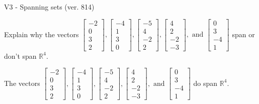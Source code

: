 \begin{exercise}
  \begin{exerciseTitle}V3 - Spanning sets (ver. 814)\end{exerciseTitle}
  \begin{exerciseStatement}
    Explain why the vectors \(\left[\begin{array}{r}
-2 \\
0 \\
3 \\
2
\end{array}\right] , \left[\begin{array}{r}
-4 \\
1 \\
3 \\
0
\end{array}\right] , \left[\begin{array}{r}
-5 \\
4 \\
-2 \\
2
\end{array}\right] , \left[\begin{array}{r}
4 \\
2 \\
-2 \\
-3
\end{array}\right] , \text{ and } \left[\begin{array}{r}
0 \\
3 \\
-4 \\
1
\end{array}\right]\) span or don't span \(\mathbb{R}^4\). 
	


  \end{exerciseStatement}
  \begin{exerciseAnswer}
   The vectors \(\left[\begin{array}{r}
-2 \\
0 \\
3 \\
2
\end{array}\right] , \left[\begin{array}{r}
-4 \\
1 \\
3 \\
0
\end{array}\right] , \left[\begin{array}{r}
-5 \\
4 \\
-2 \\
2
\end{array}\right] , \left[\begin{array}{r}
4 \\
2 \\
-2 \\
-3
\end{array}\right] , \text{ and } \left[\begin{array}{r}
0 \\
3 \\
-4 \\
1
\end{array}\right]\) 
  	 do  
	span \(\mathbb{R}^4\).
  


  \end{exerciseAnswer}
\end{exercise}